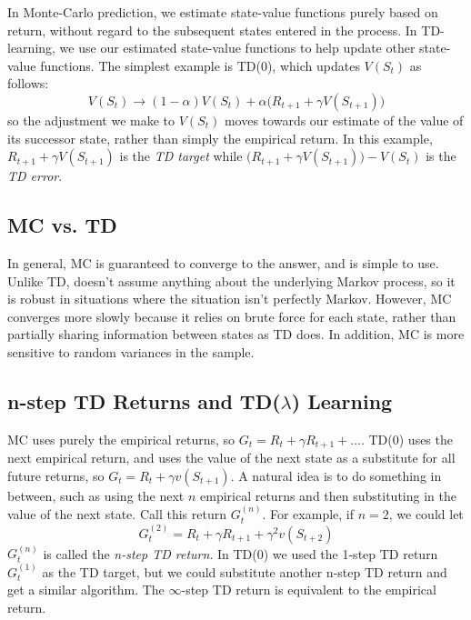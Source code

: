 \documentclass{article}
\newcommand{\ita}{\textit}
\begin{document}
In Monte-Carlo prediction, we estimate state-value functions purely based on return, without regard to the subsequent states entered in the process. In TD-learning, we use our estimated state-value functions to help update other state-value functions. The simplest example is TD(0), which updates $V(S_t)$ as follows:
\begin{equation}\label{eq:td0_update}
V(S_t) \rightarrow (1-\alpha)V(S_t) + \alpha \bigg(R_{t+1} + \gamma V(S_{t+1})\bigg)
\end{equation}
so the adjustment we make to $V(S_t)$ moves towards our estimate of the value of its successor state, rather than simply the empirical return. In this example, $R_{t+1} + \gamma V(S_{t+1})$ is the \ita{TD target} while $\bigg(R_{t+1} + \gamma V(S_{t+1})\bigg) - V(S_t)$ is the \ita{TD error}.

\subsection{MC vs. TD}

In general, MC is guaranteed to converge to the answer, and is simple to use. Unlike TD, doesn't assume anything about the underlying Markov process, so it is robust in situations where the situation isn't perfectly Markov. However, MC converges more slowly because it relies on brute force for each state, rather than partially sharing information between states as TD does. In addition, MC is more sensitive to random variances in the sample.

\subsection{n-step TD Returns and TD($\lambda$) Learning}

MC uses purely the empirical returns, so $G_t = R_t + \gamma R_{t+1} + \ldots$. TD(0) uses the next empirical return, and uses the value of the next state as a substitute for all future returns, so $G_t = R_t + \gamma v(S_{t+1})$. A natural idea is to do something in between, such as using the next $n$ empirical returns and then substituting in the value of the next state. Call this return $G^{(n)}_t$. For example, if $n = 2$, we could let
\begin{equation}\label{eq:2_step_td_return}
G^{(2)}_t = R_t + \gamma R_{t+1} + \gamma^2 v(S_{t+2})
\end{equation}
$G^{(n)}_t$ is called the \ita{n-step TD return}. In TD(0) we used the 1-step TD return $G^{(1)}_t$ as the TD target, but we could substitute another n-step TD return and get a similar algorithm. The $\infty$-step TD return is equivalent to the empirical return.
\end{document}
